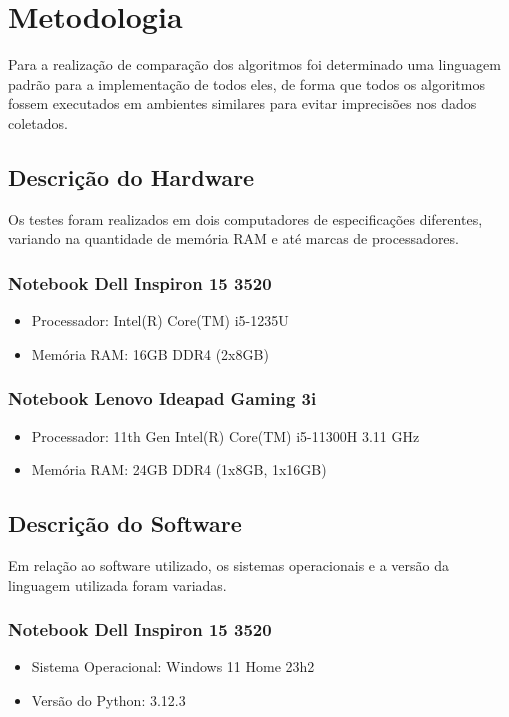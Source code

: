 \documentclass[tcc2]{uftex}
\begin{document}
\chapter{Metodologia}

Para a realização de comparação dos algoritmos foi determinado uma linguagem padrão para a implementação de todos eles, de forma que todos os algoritmos fossem executados em ambientes similares para evitar imprecisões nos dados coletados. 

\section{Descrição do Hardware}

Os testes foram realizados em dois computadores de especificações diferentes, variando na quantidade de memória RAM e até marcas de processadores.

\subsection{Notebook Dell Inspiron 15 3520}
\begin{itemize}[label=--]
    \item Processador: Intel(R) Core(TM) i5-1235U
    \item Memória RAM: 16GB DDR4 (2x8GB)
\end{itemize}

\subsection{Notebook Lenovo Ideapad Gaming 3i}
\begin{itemize}[label=--]
    \item Processador: 11th Gen Intel(R) Core(TM) i5-11300H 3.11 GHz
    \item Memória RAM: 24GB DDR4 (1x8GB, 1x16GB)
\end{itemize}

\section{Descrição do Software}

Em relação ao software utilizado, os sistemas operacionais e a versão da linguagem utilizada foram variadas.

\subsection{Notebook Dell Inspiron 15 3520}
\begin{itemize}[label=--]
    \item Sistema Operacional: Windows 11 Home 23h2
    \item Versão do Python: 3.12.3
\end{itemize}
\end{document}
